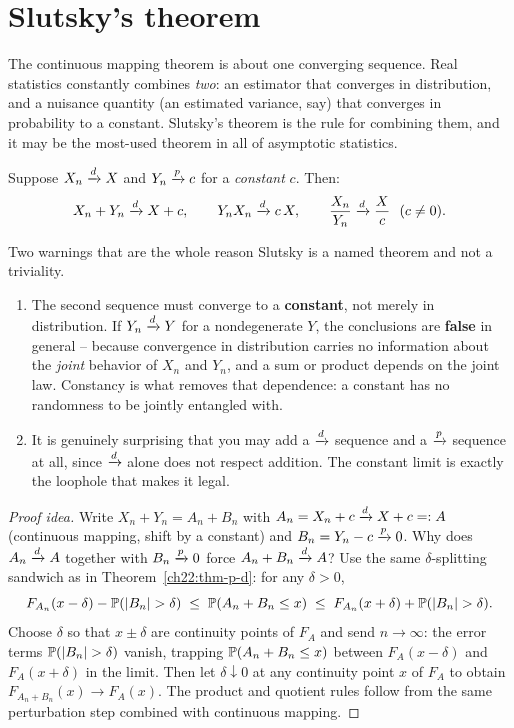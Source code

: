 \section{Slutsky's theorem}
\label{ch22:slutsky}

The continuous mapping theorem is about one converging sequence. Real statistics
constantly combines \emph{two}: an estimator that converges in distribution, and a
nuisance quantity (an estimated variance, say) that converges in probability to a
constant. Slutsky's theorem is the rule for combining them, and it may be the
most-used theorem in all of asymptotic statistics.

\begin{theorem}[Slutsky]
\label{ch22:thm-slutsky}
Suppose $X_n\dto X$ and $Y_n\pto c$ for a \emph{constant} $c$. Then:
\[
  X_n + Y_n \dto X + c,\qquad
  Y_n X_n \dto c\,X,\qquad
  \frac{X_n}{Y_n}\dto\frac{X}{c}\ \ (c\ne0).
\]
\end{theorem}

\begin{focusbox}
Two warnings that are the whole reason Slutsky is a named theorem and not a triviality.
\begin{enumerate}
\item The second sequence must converge to a \textbf{constant}, not merely in
      distribution. If $Y_n\dto Y$ for a nondegenerate $Y$, the conclusions are
      \textbf{false} in general -- because convergence in distribution carries no
      information about the \emph{joint} behavior of $X_n$ and $Y_n$, and a sum or
      product depends on the joint law. Constancy is what removes that dependence:
      a constant has no randomness to be jointly entangled with.
\item It is genuinely surprising that you may add a $\dto$ sequence and a $\pto$
      sequence at all, since $\dto$ alone does not respect addition. The constant limit
      is exactly the loophole that makes it legal.
\end{enumerate}
\end{focusbox}

\begin{proof}[Proof idea]
Write $X_n + Y_n = A_n + B_n$ with $A_n = X_n + c \dto X + c =: A$ (continuous mapping,
shift by a constant) and $B_n = Y_n - c \pto 0$. Why does $A_n \dto A$ together with
$B_n \pto 0$ force $A_n + B_n \dto A$? Use the same $\delta$-splitting sandwich as in
Theorem~\ref{ch22:thm-p-d}: for any $\delta > 0$,
\[
  F_{A_n}(x - \delta) - \P(\abs{B_n} > \delta)
  \;\le\; \P(A_n + B_n \le x)
  \;\le\; F_{A_n}(x + \delta) + \P(\abs{B_n} > \delta).
\]
Choose $\delta$ so that $x \pm \delta$ are continuity points of $F_A$ and send
$n \to \infty$: the error terms $\P(\abs{B_n} > \delta)$ vanish, trapping
$\P(A_n + B_n \le x)$ between $F_A(x-\delta)$ and $F_A(x+\delta)$ in the limit. Then let
$\delta \downarrow 0$ at any continuity point $x$ of $F_A$ to obtain
$F_{A_n + B_n}(x) \to F_A(x)$. The product and quotient rules follow from the same
perturbation step combined with continuous mapping.
\end{proof}

